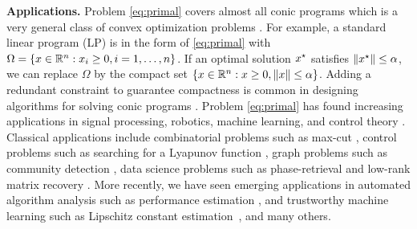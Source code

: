 \documentclass[11pt]{article}
\begin{document}
\vspace{3pt}
\noindent \textbf{Applications.} Problem \eqref{eq:primal} covers almost all conic programs which is a very general class of convex optimization problems \cite{wolkowicz2012handbook}. 
For example, a standard linear program (LP) is in the form of \eqref{eq:primal} with $\Omega = \{x \in \mathbb{R}^n : x_i \geq 0, i=1,\ldots,n\}$. If an optimal solution $x^\star$  satisfies $\|x^\star\| \leq \alpha$, we can replace $\Omega$ by the compact set $\{x\in \mathbb{R}^n : x \geq0, \|x\| \leq \alpha \}$. Adding a redundant constraint to guarantee compactness is common in designing algorithms for solving conic programs \cite{hough2024primal,liao2023overview,ding2023revisiting,yurtsever2021scalable}. 
%
Problem \eqref{eq:primal} has found increasing applications in signal processing, robotics,  machine learning, and control theory  \cite{wolkowicz2012handbook,zheng2021chordal}. Classical applications include combinatorial problems such as max-cut \cite{goemans1995improved}, control problems such as searching for a Lyapunov function \cite{papachristodoulou2002construction}, graph problems such as community detection \cite{abbe2014decoding}, data science problems such as phase-retrieval \cite{candes2013phaselift} and low-rank matrix recovery \cite{chen2013low}. More recently, we have seen emerging applications in automated algorithm analysis 
 such as performance estimation  \cite{goujaud2024pepit}, and trustworthy machine learning such as Lipschitz constant estimation~\cite{wang2024scalability}, and many others.  
\end{document}
